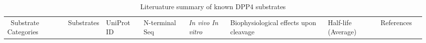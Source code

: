 \begin{table*} 
\caption {Literuature summary of known DPP4 substrates}
\label{DPP4-Sub}

\begin{tabular}{|l|l|l|l|l|l|l|l|l|}
    \hline
    \ Substrate Categories & Substrates & UniProt ID & N-terminal Seq & \textit{In vivo}\/ \textit{In vitro} & Biophysiological effects upon cleavage & Half-life (Average) & References
\end{tabular}
\end{table*}